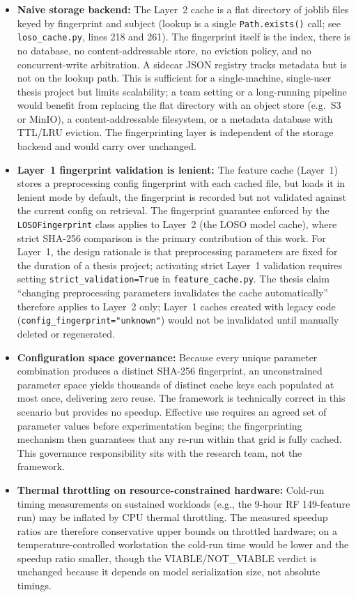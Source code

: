 \begin{itemize}
\item \textbf{Naive storage backend:} The Layer~2 cache is a flat
 directory of joblib files keyed by fingerprint and subject
 (lookup is a single \texttt{Path.exists()} call;
 see \texttt{loso\_cache.py}, lines 218 and 261). The fingerprint
 itself is the index, there is no database, no
 content-addressable store, no eviction policy, and no
 concurrent-write arbitration. A sidecar JSON registry tracks
 metadata but is not on the lookup path. This is sufficient for
 a single-machine, single-user thesis project but limits
 scalability; a team setting or a long-running pipeline would
 benefit from replacing the flat directory with an object store
 (e.g.\ S3 or MinIO), a content-addressable filesystem, or a
 metadata database with TTL/LRU eviction. The fingerprinting
 layer is independent of the storage backend and would carry
 over unchanged.

\item \textbf{Layer~1 fingerprint validation is lenient:} The feature cache
 (Layer~1) stores a preprocessing config fingerprint with each cached
 file, but loads it in lenient mode by default, the fingerprint is
 recorded but not validated against the current config on retrieval.
 The fingerprint guarantee enforced by the \texttt{LOSOFingerprint} class
 applies to Layer~2 (the LOSO model cache), where strict SHA-256
 comparison is the primary contribution of this work. For Layer~1, the
 design rationale is that preprocessing parameters are fixed for the
 duration of a thesis project; activating strict Layer~1 validation
 requires setting \texttt{strict\_validation=True} in \texttt{feature\_cache.py}.
 The thesis claim ``changing preprocessing parameters invalidates the
 cache automatically'' therefore applies to Layer~2 only; Layer~1 caches
 created with legacy code (\texttt{config\_fingerprint="unknown"}) would
 not be invalidated until manually deleted or regenerated.

\item \textbf{Configuration space governance:} Because every unique parameter
 combination produces a distinct SHA-256 fingerprint, an unconstrained
 parameter space yields thousands of distinct cache keys each populated
 at most once, delivering zero reuse. The framework is technically correct
 in this scenario but provides no speedup. Effective use requires an
 agreed set of parameter values before experimentation begins; the
 fingerprinting mechanism then guarantees that any re-run within that
 grid is fully cached. This governance responsibility sits with the
 research team, not the framework.

\item \textbf{Thermal throttling on resource-constrained hardware:}
 Cold-run timing measurements on sustained workloads (e.g., the 9-hour
 RF 149-feature run) may be inflated by CPU thermal throttling.
 The measured speedup ratios are therefore conservative upper bounds on
 throttled hardware; on a temperature-controlled workstation the cold-run
 time would be lower and the speedup ratio smaller, though the
 VIABLE/NOT\_VIABLE verdict is unchanged because it depends on model
 serialization size, not absolute timings.
\end{itemize}


